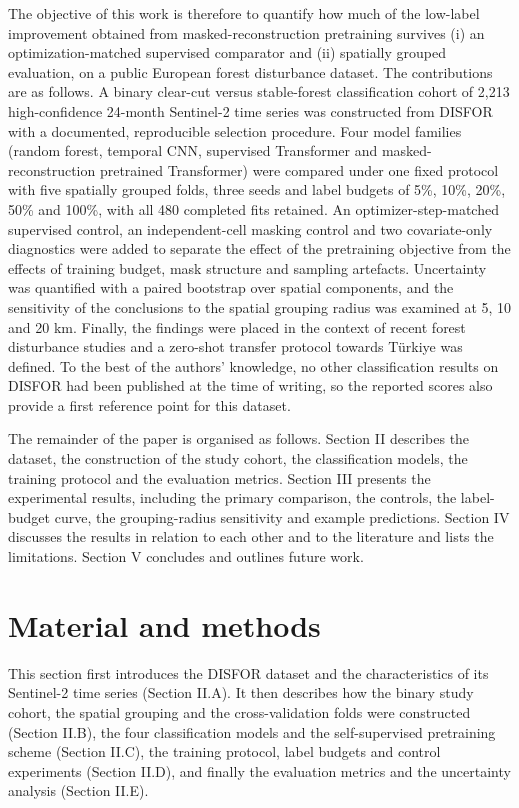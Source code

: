 \documentclass[11pt,a4paper]{article}
\begin{document}
The objective of this work is therefore to quantify how much of the low-label improvement obtained from masked-reconstruction pretraining survives (i) an optimization-matched supervised comparator and (ii) spatially grouped evaluation, on a public European forest disturbance dataset. The contributions are as follows. A binary clear-cut versus stable-forest classification cohort of 2,213 high-confidence 24-month Sentinel-2 time series was constructed from DISFOR \cite{ref1} with a documented, reproducible selection procedure. Four model families (random forest, temporal CNN, supervised Transformer and masked-reconstruction pretrained Transformer) were compared under one fixed protocol with five spatially grouped folds, three seeds and label budgets of 5\%, 10\%, 20\%, 50\% and 100\%, with all 480 completed fits retained. An optimizer-step-matched supervised control, an independent-cell masking control and two covariate-only diagnostics were added to separate the effect of the pretraining objective from the effects of training budget, mask structure and sampling artefacts. Uncertainty was quantified with a paired bootstrap over spatial components, and the sensitivity of the conclusions to the spatial grouping radius was examined at 5, 10 and 20 km. Finally, the findings were placed in the context of recent forest disturbance studies and a zero-shot transfer protocol towards Türkiye was defined. To the best of the authors' knowledge, no other classification results on DISFOR had been published at the time of writing, so the reported scores also provide a first reference point for this dataset.

The remainder of the paper is organised as follows. Section II describes the dataset, the construction of the study cohort, the classification models, the training protocol and the evaluation metrics. Section III presents the experimental results, including the primary comparison, the controls, the label-budget curve, the grouping-radius sensitivity and example predictions. Section IV discusses the results in relation to each other and to the literature and lists the limitations. Section V concludes and outlines future work.

\section{Material and methods}
This section first introduces the DISFOR dataset and the characteristics of its Sentinel-2 time series (Section II.A). It then describes how the binary study cohort, the spatial grouping and the cross-validation folds were constructed (Section II.B), the four classification models and the self-supervised pretraining scheme (Section II.C), the training protocol, label budgets and control experiments (Section II.D), and finally the evaluation metrics and the uncertainty analysis (Section II.E).
\end{document}
